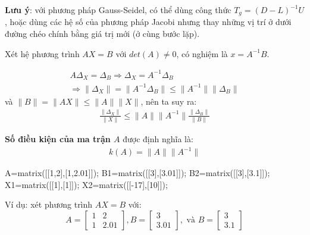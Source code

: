 \documentclass[12pt]{article}
\begin{document}
\textbf{Lưu ý}: với phương pháp Gauss-Seidel, có thể dùng công thức $T_g=(D-L)^{-1}U$, hoặc dùng các hệ số của phương pháp Jacobi nhưng thay những vị trí ở dưới đường chéo chính bằng giá trị mới (ở cùng bước lặp).

\newpage{}

Xét hệ phương trình $AX=B$ với $det(A)\neq 0$, có nghiệm là $x=A^{-1}B$. 

\begin{align*}
 A \Delta_X=\Delta_B \Rightarrow \Delta_X=A^{-1} \Delta_B \\
 \Rightarrow \|\Delta_X \|=\|A^{-1} \Delta_B \| \leq \|A^{-1}\| \|\Delta_B\|
\end{align*}
và $\|B\|=\|AX\|\leq \|A\| \|X\|$, nên ta suy ra:
\begin{align*}
 \frac{\|\Delta_X\|}{\|X\|} \leq \|A\| \|A^{-1}\| \frac{\|\Delta_B\|}{\|B\|}
\end{align*}

\textbf{Số điều kiện của ma trận $A$} được định nghĩa là:
\begin{align}
k(A) = \|A\| \|A^{-1}\|
\end{align}

\newpage{}


\begin{sagesilent}
A=matrix([[1,2],[1,2.01]]);
B1=matrix([[3],[3.01]]);
B2=matrix([[3],[3.1]]);
X1=matrix([[1],[1]]);
X2=matrix([[-17],[10]]);
\end{sagesilent}

Ví dụ: xét phương trình $AX=B$ với:
\begin{equation}
 A=\begin{bmatrix}  1 & 2\\ 1 & 2.01 \end{bmatrix}, B=\begin{bmatrix}  3 \\ 3.01 \end{bmatrix}, \textrm{~và~} B=\begin{bmatrix}  3 \\ 3.1 \end{bmatrix} 
\end{equation}
\end{document}
